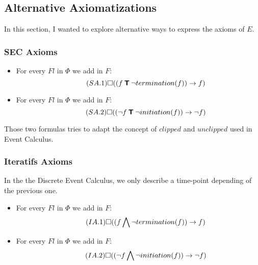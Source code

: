\subsection{Alternative Axiomatizations}

In this section, I wanted to explore alternative ways to express the axioms of $E$.

\subsubsection{SEC Axioms}

\begin{itemize}
  \item
    For every $Fl$ in $\Phi$ we add in $F$:
    \begin{equation}\tag{$SA.1$}
      \square((f \mathbin{\bm{\mathsf{T}}} \neg termination(f)) \rightarrow f)
    \end{equation}
  \item
    For every $Fl$ in $\Phi$ we add in $F$:
    \begin{equation}\tag{$SA.2$}
      \square((\neg f \mathbin{\bm{\mathsf{T}}} \neg initiation(f)) \rightarrow \neg f)
    \end{equation}
\end{itemize}

Those two formulas tries to adapt the concept of $clipped$ and $unclipped$ used in Event Calculus.

\subsubsection{Iteratifs Axioms}

In the the Discrete Event Calculus, we only describe a time-point depending of the previous one.

\begin{itemize}
  \item
    For every $Fl$ in $\Phi$ we add in $F$:
    \begin{equation}\tag{$IA.1$}
      \square((f \bigwedge \neg termination(f)) \rightarrow f)
    \end{equation}
  \item
    For every $Fl$ in $\Phi$ we add in $F$:
    \begin{equation}\tag{$IA.2$}
      \square((\neg f \bigwedge \neg initiation(f)) \rightarrow \neg f)
    \end{equation}
\end{itemize}

